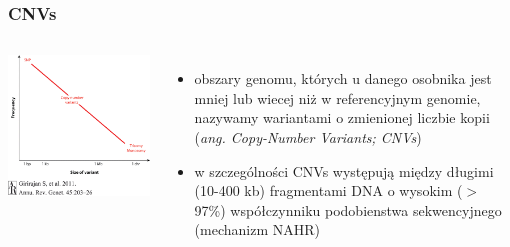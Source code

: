 \documentclass[table]{beamer}
\begin{document}
\begin{frame}\frametitle{CNVs}
\begin{columns}    
\begin{center}
	   \includegraphics[width=0.9 \textwidth]{new-images/CNVsize.png}\\
\end{center}
\begin{itemize}
\item obszary genomu, których u danego osobnika jest mniej lub wiecej niż w referencyjnym genomie,
nazywamy wariantami o zmienionej liczbie kopii ({\em ang. Copy-Number Variants; CNVs})
\item w szczególności CNVs występują między długimi (10-400 kb) fragmentami DNA o wysokim ($>$ 97\%) współczynniku podobienstwa sekwencyjnego (mechanizm NAHR)
\end{itemize}
\end{columns}
\end{frame}
\end{document}
